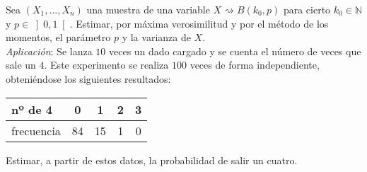 \begin{ejercicio}
    Sea $(X_1, \ldots, X_n)$ una muestra de una variable $X\rightsquigarrow B(k_0,p)$ para cierto $k_0\in \mathbb{N}$ y $p\in \left]0,1\right[$. Estimar, por máxima verosimilitud y por el método de los momentos, el parámetro $p$ y la varianza de $X$.\\

    \noindent
    \textit{Aplicación}: Se lanza $10$ veces un dado cargado y se cuenta el número de veces que sale un $4$. Este experimento se realiza $100$ veces de forma independiente, obteniéndose los siguientes resultados:
    \begin{table}[H]
    \centering
    \begin{tabular}{l|cccc}
        nº de 4 & 0 & 1 & 2 & 3 \\
        \hline
        frecuencia & 84 & 15 & 1 & 0
    \end{tabular}
    \end{table}
    \noindent
    Estimar, a partir de estos datos, la probabilidad de salir un cuatro.\\


\end{ejercicio}
